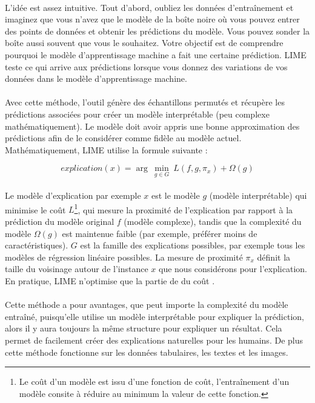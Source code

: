 \documentclass[10pt, french, a4paper]{report}
\begin{document}
\paragraph{}
L'idée est assez intuitive. Tout d'abord, oubliez les données d'entraînement et imaginez que vous n'avez que le modèle de la boîte noire où vous pouvez entrer des points de données et obtenir les prédictions du modèle. Vous pouvez sonder la boîte aussi souvent que vous le souhaitez. Votre objectif est de comprendre pourquoi le modèle d'apprentissage machine a fait une certaine prédiction. LIME teste ce qui arrive aux prédictions lorsque vous donnez des variations de vos données dans le modèle d'apprentissage machine.

\paragraph{}
Avec cette méthode, l'outil génère des échantillons permutés et récupère les prédictions associées pour créer un modèle interprétable (peu complexe mathématiquement). Le modèle doit avoir appris une bonne approximation des prédictions afin de le considérer comme fidèle au modèle actuel. Mathématiquement, LIME utilise la formule suivante :

\begin{equation}
  explication(x) = \arg\ \underset{g \in G}{\min}\ L(f,g,\pi_x) + \Omega(g)
\end{equation}

\paragraph{}
Le modèle d'explication par exemple $x$ est le modèle $g$ (modèle interprétable) qui minimise le coût $L$\footnote{Le coût d'un modèle est issu d'une fonction de coût, l'entraînement d'un modèle consite à réduire au minimum la valeur de cette fonction.}, qui mesure la proximité de l'explication par rapport à la prédiction du modèle original $f$ (modèle complexe), tandis que la complexité du modèle $\Omega(g)$ est maintenue faible (par exemple, préférer moins de caractéristiques). $G$ est la famille des explications possibles, par exemple tous les modèles de régression linéaire possibles. La mesure de proximité $\pi_x$ définit la taille du voisinage autour de l'instance $x$ que nous considérons pour l'explication. En pratique, LIME n'optimise que la partie de du coût \citep{molnar2019}.

\paragraph{}
Cette méthode a pour avantages, que peut importe la complexité du modèle entraîné, puisqu'elle utilise un modèle interprétable pour expliquer la prédiction, alors il y aura toujours la même structure pour expliquer un résultat. Cela permet de facilement créer des explications naturelles pour les humains. De plus cette méthode fonctionne sur les données tabulaires, les textes et les images. 
\end{document}
